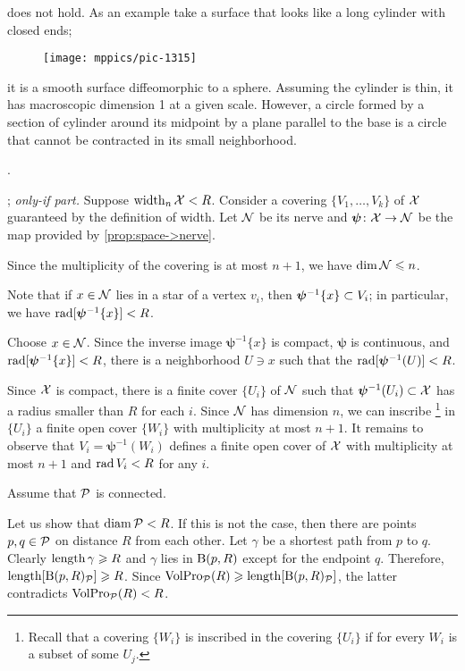  does not hold.
As an example take a surface that looks like a long cylinder with closed ends;
\begin{figure}[h!]
\vskip0mm
\centering
\texttt{[image: mppics/pic-1315]}
\end{figure}
it is a smooth surface diffeomorphic to a sphere.
Assuming the cylinder is thin, it has macroscopic dimension 1 at a given scale.
However, a circle formed by a section of cylinder around its midpoint by a plane parallel to the base is a circle that cannot be contracted in its small neighborhood.

 \cite[Appendix $1(\text{E}_{2})$]{gromov-1983}.

\parbf{\ref{ex:width=suprad(inv)}}; \textit{only-if part.}
Suppose $\operatorname{\rm width}\nolimits_n\mathcal{X}<R$.
Consider a covering $\{V_1,\dots,V_k\}$ of $\mathcal{X}$ guaranteed by the definition of width.
Let $\mathcal{N}$ be its nerve and $\bm{\psi}\colon\mathcal{X}\to \mathcal{N}$ be the map provided by \ref{prop:space->nerve}.

Since the multiplicity of the covering is at most $n+1$, we have $\operatorname{\rm dim}\nolimits \mathcal{N}\leqslant n$.

Note that if $x\in \mathcal{N}$ lies in a star of a vertex $v_i$,
then $\bm{\psi}^{-1}\{x\}\z\subset V_i$;
in particular, we have $\mathop{\rm rad}\nolimits[\bm{\psi}^{-1}\{x\}]<R$.

Choose $x\in \mathcal{N}$.
Since the inverse image $\bm{\psi}^{-1}\{x\}$ is compact, $\bm{\psi}$ is continuous, and $\mathop{\rm rad}\nolimits[\bm{\psi}^{-1}\{x\}]<R$,
there is a neighborhood $U\ni x$ such that the  $\mathop{\rm rad}\nolimits[\bm{\psi}^{-1}(U)]<R$.

Since $\mathcal{X}$ is compact,  there is a finite cover $\{U_i\}$ of $\mathcal{N}$ such that $\bm{\psi}^{-1}(U_i)\subset\mathcal{X}$ has a radius smaller than $R$ for each $i$.
Since $\mathcal{N}$ has dimension $n$, we can inscribe%
\footnote{Recall that a covering $\{W_i\}$ is inscribed in the covering $\{U_i\}$ if for every $W_i$ is a subset of some $U_j$.} 
in $\{U_i\}$ a finite open cover $\{W_i\}$ with multiplicity at most $n+1$.
It remains to observe that $V_i=\bm{\psi}^{-1}(W_i)$ defines a finite open cover of $\mathcal{X}$ with  multiplicity at most $n+1$ and $\mathop{\rm rad}\nolimits V_i<R$ for any $i$. 

Assume that $\mathcal{P}$ is connected.

Let us show that $\operatorname{\rm diam}\nolimits\mathcal{P}<R$.
If this is not the case, then there are points $p,q\in\mathcal{P}$ on distance $R$ from each other.
Let $\gamma$ be a shortest path from $p$ to $q$.
Clearly $\mathop{\rm length}\nolimits\gamma\geqslant R$ and $\gamma$ lies in $\mathrm{B}{}(p,R)$ except for the endpoint $q$.
Therefore, $\mathop{\rm length}\nolimits[\mathrm{B}{}(p,R)_{\mathcal{P}}]\geqslant R$.
Since $\VolPro_{\spc{P}}(R)\z\ge \length[\oBall(p,R)_{\spc{P}}]$,
the latter contradicts $\operatorname{\rm VolPro}\nolimits_{\mathcal{P}}(R)<R$.


